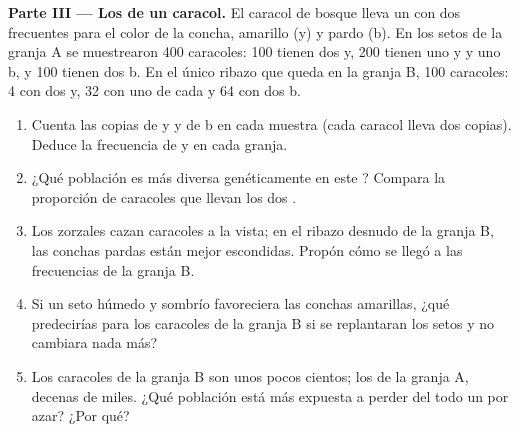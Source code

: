 \begin{problem}
\medskip
\noindent\textbf{Parte III --- Los  de un caracol.}
El caracol de bosque lleva un  con dos  frecuentes para el
color de la concha, amarillo (y) y pardo (b). En los setos de la granja
A se muestrearon 400 caracoles: 100 tienen dos  y, 200 tienen uno
y y uno b, y 100 tienen dos b. En el único ribazo que queda en la
granja B, 100 caracoles: 4 con dos y, 32 con uno de cada y 64 con dos
b.
\begin{enumerate}[resume]
  \item Cuenta las copias de y y de b en cada muestra (cada caracol
        lleva dos copias). Deduce la frecuencia de y en cada granja.
  \item ¿Qué población es más diversa genéticamente en este ?
        Compara la proporción de caracoles que llevan los dos .
  \item Los zorzales cazan caracoles a la vista; en el ribazo desnudo
        de la granja B, las conchas pardas están mejor escondidas.
        Propón cómo se llegó a las frecuencias de la granja B.
  \item Si un seto húmedo y sombrío favoreciera las conchas amarillas,
        ¿qué predecirías para los caracoles de la granja B si se
        replantaran los setos y no cambiara nada más?
  \item Los caracoles de la granja B son unos pocos cientos; los de la
        granja A, decenas de miles. ¿Qué población está más expuesta a
        perder del todo un  por azar? ¿Por qué?
\end{enumerate}


\end{problem}
